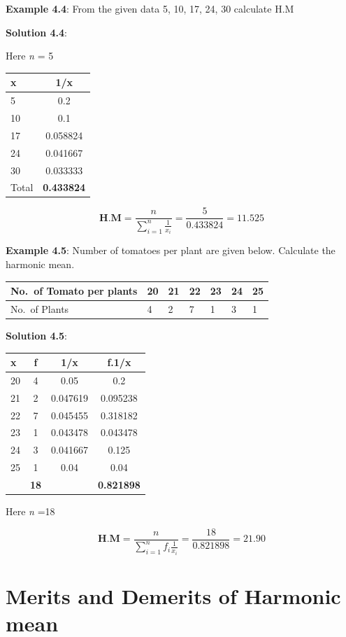 \documentclass[
]{book}
\begin{document}
\textbf{Example 4.4}: From the given data 5, 10, 17, 24, 30 calculate H.M

\textbf{Solution 4.4}:

Here \emph{n} = 5

\begin{longtable}[]{@{}lc@{}}
\toprule
x & 1/x \\
\midrule
\endhead
5 & 0.2 \\
10 & 0.1 \\
17 & 0.058824 \\
24 & 0.041667 \\
30 & 0.033333 \\
Total & \textbf{0.433824} \\
\bottomrule
\end{longtable}

\[\mathbf{\text{H.M}} = \frac{n}{\sum_{i = 1}^{n}\frac{1}{x_{i}}} = \frac{5}{0.433824} = 11.525\]

\textbf{Example 4.5}: Number of tomatoes per plant are given below. Calculate
the harmonic mean.

\begin{longtable}[]{@{}lllllll@{}}
\toprule
No.~of Tomato per plants & 20 & 21 & 22 & 23 & 24 & 25 \\
\midrule
\endhead
No.~of Plants & 4 & 2 & 7 & 1 & 3 & 1 \\
\bottomrule
\end{longtable}

\textbf{Solution 4.5}:

\begin{longtable}[]{@{}lccc@{}}
\toprule
x & f & 1/x & f.1/x \\
\midrule
\endhead
20 & 4 & 0.05 & 0.2 \\
21 & 2 & 0.047619 & 0.095238 \\
22 & 7 & 0.045455 & 0.318182 \\
23 & 1 & 0.043478 & 0.043478 \\
24 & 3 & 0.041667 & 0.125 \\
25 & 1 & 0.04 & 0.04 \\
& \textbf{18} & & \textbf{0.821898} \\
\bottomrule
\end{longtable}

Here \emph{n} =18

\[\mathbf{\text{H.M}} = \frac{n}{\sum_{i = 1}^{n}{f_{i}\frac{1}{x_{i}}}} = \frac{18}{0.821898} = 21.90\]

\hypertarget{merits-and-demerits-of-harmonic-mean}{%
\section{Merits and Demerits of Harmonic mean}\label{merits-and-demerits-of-harmonic-mean}}
\end{document}
